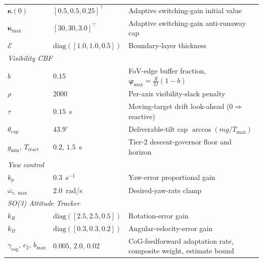 \documentclass{IEEEtaes}
\theoremstyle{definition}
\theoremstyle{remark}
\begin{document}
\begin{table}[!t]
\begin{tabular}{p{} p{} p{}}
        $\boldsymbol{\kappa}(0)$ & $[0.5,0.5,0.25]^\top$ & Adaptive switching-gain initial value \\
        $\boldsymbol{\kappa}_{\max}$ & $[30,30,3.0]^\top$ & Adaptive switching-gain anti-runaway cap \\
        $\mathcal{E}$           & $\text{diag}([1.0,1.0,0.5])$ & Boundary-layer thickness \\
    \midrule
        \multicolumn{3}{l}{\textit{Visibility CBF}} \\
        $b$                         & $0.15$ & FoV-edge buffer fraction, $\boldsymbol{\varphi}_\text{max}=\tfrac{\mathcal{R}}{2f}(1-b)$ \\
        $\rho$                      & $2000$ & Per-axis visibility-slack penalty \\
        $\tau$                      & $0.15$~s & Moving-target drift look-ahead ($0\Rightarrow$ reactive) \\
        $\theta_\text{cap}$         & $43.9^\circ$ & Deliverable-tilt cap $\arccos(mg/T_\text{max})$ \\
        $g_\text{min},\,T_\text{react}$ & $0.2,\,1.5$~s & Tier-2 descent-governor floor and horizon \\
    \midrule
        \multicolumn{3}{l}{\textit{Yaw control}} \\
        $k_p$                     & $0.3$~s$^{-1}$ & Yaw-error proportional gain \\
        $\omega_{r,\max}$         & $2.0$~rad/s & Desired-yaw-rate clamp \\
    \midrule
        \multicolumn{3}{l}{\textit{SO(3) Attitude Tracker}} \\
        $k_R$      & $\text{diag}([2.5,2.5,0.5])$ & Rotation-error gain \\
        $k_\Omega$ & $\text{diag}([0.3,0.3,0.2])$ & Angular-velocity-error gain \\
        $\gamma_\text{cog},\,c_2,\,b_{\max}$ & $0.005,\,2.0,\,0.02$ & CoG-feedforward adaptation rate, composite weight, estimate bound \\
    \bottomrule
    \end{tabular}
\end{table}
\end{document}
